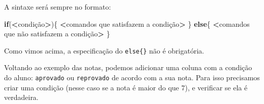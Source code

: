 \documentclass[10pt,a4paper]{book}
\newenvironment{Shaded}{\begin{snugshade}}{\end{snugshade}}
\newcommand{\ControlFlowTok}[1]{\textcolor[rgb]{0.13,0.29,0.53}{\textbf{#1}}}
\newcommand{\OperatorTok}[1]{\textcolor[rgb]{0.81,0.36,0.00}{\textbf{#1}}}
\newcommand{\NormalTok}[1]{#1}
\begin{document}
A sintaxe será sempre no formato:

\begin{Shaded}
\begin{Highlighting}[]
\ControlFlowTok{if}\NormalTok{(}\OperatorTok{<}\NormalTok{condição}\OperatorTok{>}\NormalTok{)\{}
    \OperatorTok{<}\NormalTok{comandos que satisfazem a condição}\OperatorTok{>}
\NormalTok{\} }\ControlFlowTok{else}\NormalTok{\{}
   \OperatorTok{<}\NormalTok{comandos que não satisfazem a condição}\OperatorTok{>}
\NormalTok{\}}
\end{Highlighting}
\end{Shaded}

Como vimos acima, a especificação do \texttt{else\{\}} não é
obrigatória.

Voltando ao exemplo das notas, podemos adicionar uma coluna com a
condição do aluno: \texttt{aprovado} ou \texttt{reprovado} de acordo com
a sua nota. Para isso precisamos criar uma condição (nesse caso se a
nota é maior do que 7), e verificar se ela é verdadeira.
\end{document}
